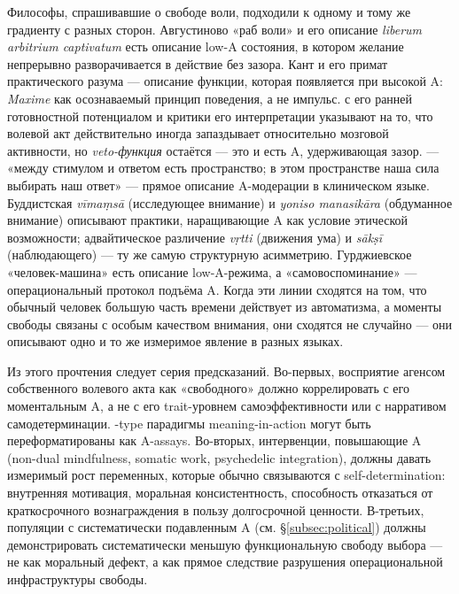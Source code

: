 Философы, спрашивавшие о свободе воли, подходили к одному и тому же градиенту с разных сторон. Августиново «раб воли» и его описание \textit{liberum arbitrium captivatum} есть описание low-A состояния, в котором желание непрерывно разворачивается в действие без зазора. Кант и его примат практического разума --- описание функции, которая появляется при высокой A: \emph{Maxime} как осознаваемый принцип поведения, а не импульс. \citet{libet1985} с его ранней готовностной потенциалом и критики его интерпретации \citep[см.][]{frith2008} указывают на то, что волевой акт действительно иногда запаздывает относительно мозговой активности, но \emph{veto-функция} остаётся --- это и есть A, удерживающая зазор. \citet{frankl1946} --- «между стимулом и ответом есть пространство; в этом пространстве наша сила выбирать наш ответ» --- прямое описание A-модерации в клиническом языке. Буддистская \textit{vīmaṃsā} (исследующее внимание) и \textit{yoniso manasikāra} (обдуманное внимание) описывают практики, наращивающие A как условие этической возможности; адвайтическое различение \textit{vṛtti} (движения ума) и \textit{sākṣī} (наблюдающего) --- ту же самую структурную асимметрию. Гурджиевское «человек-машина» есть описание low-A-режима, а «самовоспоминание» --- операциональный протокол подъёма A. Когда эти линии сходятся на том, что обычный человек большую часть времени действует из автоматизма, а моменты свободы связаны с особым качеством внимания, они сходятся не случайно --- они описывают одно и то же измеримое явление в разных языках.

Из этого прочтения следует серия предсказаний. Во-первых, восприятие агенсом собственного волевого акта как «свободного» должно коррелировать с его моментальным A, а не с его trait-уровнем самоэффективности или с нарративом самодетерминации. \citet{westgate2019}-type парадигмы meaning-in-action могут быть переформатированы как A-assays. Во-вторых, интервенции, повышающие A (non-dual mindfulness, somatic work, psychedelic integration), должны давать измеримый рост переменных, которые обычно связываются с self-determination: внутренняя мотивация, моральная консистентность, способность отказаться от краткосрочного вознаграждения в пользу долгосрочной ценности. В-третьих, популяции с систематически подавленным A (см. §\ref{subsec:political}) должны демонстрировать систематически меньшую функциональную свободу выбора --- не как моральный дефект, а как прямое следствие разрушения операциональной инфраструктуры свободы.

